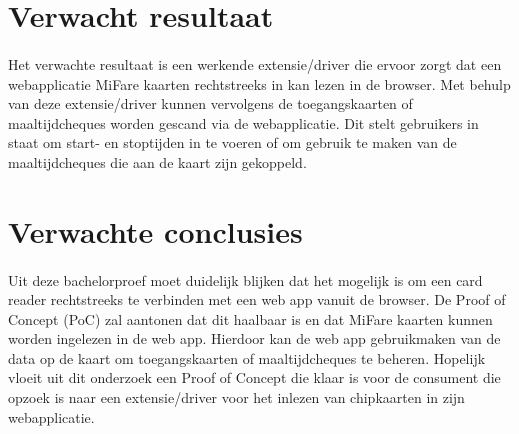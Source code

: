 \section{Verwacht resultaat}%
\label{sec:verwachte_resultaten}
\paragraph{}
Het verwachte resultaat is een werkende extensie/driver die ervoor zorgt dat een webapplicatie MiFare kaarten rechtstreeks in kan lezen in de browser. Met behulp van deze extensie/driver kunnen vervolgens de toegangskaarten of maaltijdcheques worden gescand via de webapplicatie. Dit stelt gebruikers in staat om start- en stoptijden in te voeren of om gebruik te maken van de maaltijdcheques die aan de kaart zijn gekoppeld.

\bigskip
\section{Verwachte conclusies}%
\label{sec:Verwachte_conclusies}
\paragraph{}
Uit deze bachelorproef moet duidelijk blijken dat het mogelijk is om een card reader rechtstreeks te verbinden met een web app vanuit de browser. De Proof of Concept (PoC) zal aantonen dat dit haalbaar is en dat MiFare kaarten kunnen worden ingelezen in de web app. Hierdoor kan de web app gebruikmaken van de data op de kaart om toegangskaarten of maaltijdcheques te beheren. Hopelijk vloeit uit dit onderzoek een Proof of Concept die klaar is voor de consument die opzoek is naar een extensie/driver voor het inlezen van chipkaarten in zijn webapplicatie.
